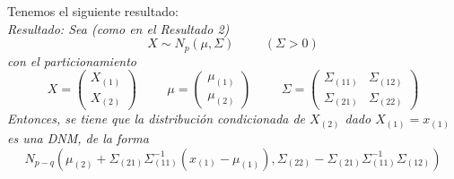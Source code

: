 \documentclass[11pt,a4paper]{article}
\begin{document}
\begin{enumerate}[label=\arabic*.]
Tenemos el siguiente resultado: \\
\itshape
Resultado: Sea (como en el Resultado 2)
$$X \sim N_{p}(\mu, \Sigma) \hspace{1cm} (\Sigma > 0)$$
con el particionamiento
$$X = \begin{pmatrix} X_{(1)} \\ X_{(2)} \end{pmatrix} \hspace{1cm} \mu = \begin{pmatrix} \mu_{(1)} \\ \mu_{(2)} \end{pmatrix} \hspace{1cm} \Sigma = \begin{pmatrix}
\Sigma_{(11)} & \Sigma_{(12)} \\
\Sigma_{(21)} & \Sigma_{(22)}
\end{pmatrix}$$
Entonces, se tiene que la distribución condicionada de $X_{(2)}$ dado $X_{(1)} = x_{(1)}$ es una DNM, de la forma
$$N_{p-q}(\mu_{(2)} + \Sigma_{(21)}\Sigma_{(11)}^{-1}(x_{(1)} - \mu_{(1)}), \Sigma_{(22)} - \Sigma_{(21)}\Sigma_{(11)}^{-1}\Sigma_{(12)})$$
\normalfont


\end{enumerate}
\end{document}
